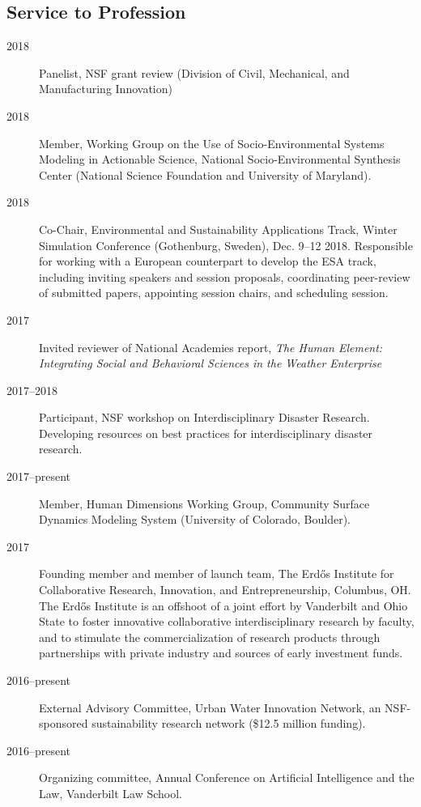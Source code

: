 \documentclass[10pt]{article}
\begin{document}
	\subsection{Service to Profession}
    	\begin{description}
            \item[2018] Panelist, NSF grant review (Division of Civil, Mechanical, and Manufacturing Innovation)
            \item[2018] Member, Working Group on the Use of Socio-Environmental Systems Modeling in Actionable Science, National Socio-Environmental Synthesis Center (National Science Foundation and University of Maryland).
            \item[2018] Co-Chair, Environmental and Sustainability Applications Track, Winter Simulation Conference (Gothenburg, Sweden), Dec. 9--12 2018. Responsible for working with a European counterpart to develop the ESA track, including inviting speakers and session proposals, coordinating peer-review of submitted papers, appointing session chairs, and scheduling session.
            \item[2017] Invited reviewer of National Academies report, \emph{The Human Element: Integrating Social and Behavioral Sciences in the Weather Enterprise}
            \item[2017--2018] Participant, NSF workshop on Interdisciplinary Disaster Research. Developing resources on best practices for interdisciplinary disaster research.
            \item[2017--present] Member, Human Dimensions Working Group, Community Surface Dynamics Modeling System (University of Colorado, Boulder).
            \item[2017] Founding member and member of launch team, The Erd\H{o}s Institute for Collaborative Research, Innovation, and Entrepreneurship, Columbus, OH. The Erd\H{o}s Institute is an offshoot of
            a joint effort by Vanderbilt and Ohio State to foster innovative collaborative interdisciplinary research by faculty, and to stimulate the commercialization of research products through partnerships
            with private industry and sources of early investment funds.
            \item[2016--present] External Advisory Committee, Urban Water Innovation Network, an NSF-sponsored sustainability research network (\$12.5 million funding).
            \item[2016--present] Organizing committee, Annual Conference on Artificial Intelligence and the Law, Vanderbilt Law School.

\end{description}
\end{document}
